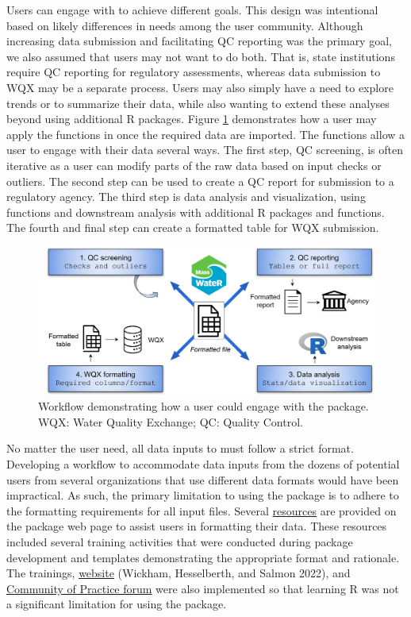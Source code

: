 Users can engage with  to achieve different goals. This design was intentional based on likely differences in needs among the user community. Although increasing data submission and facilitating QC reporting was the primary goal, we also assumed that users may not want to do both. That is, state institutions require QC reporting for regulatory assessments, whereas data submission to WQX may be a separate process. Users may also simply have a need to explore trends or to summarize their data, while also wanting to extend these analyses beyond  using additional R packages. Figure \ref{fig:workflow} demonstrates how a user may apply the functions in  once the required data are imported. The functions allow a user to engage with their data several ways. The first step, QC screening, is often iterative as a user can modify parts of the raw data based on input checks or outliers. The second step can be used to create a QC report for submission to a regulatory agency. The third step is data analysis and visualization, using  functions and downstream analysis with additional R packages and functions. The fourth and final step can create a formatted table for WQX submission.

\begin{figure}
\includegraphics[width=1\linewidth]{figs/workflow} \caption{Workflow demonstrating how a user could engage with the  package. WQX: Water Quality Exchange; QC: Quality Control.}\label{fig:workflow}
\end{figure}

No matter the user need, all data inputs to  must follow a strict format. Developing a workflow to accommodate data inputs from the dozens of potential users from several organizations that use different data formats would have been impractical. As such, the primary limitation to using the package is to adhere to the formatting requirements for all input files. Several \href{https://massbays-tech.github.io/MassWateR/RESOURCES.html}{resources} are provided on the package web page to assist users in formatting their data. These resources included several training activities that were conducted during package development and templates demonstrating the appropriate format and rationale. The trainings,  \href{https://massbays-tech.github.io/MassWateR/}{website} (Wickham, Hesselberth, and Salmon 2022), and \href{https://massbays.discourse.group/login}{Community of Practice forum} were also implemented so that learning R was not a significant limitation for using the package.


